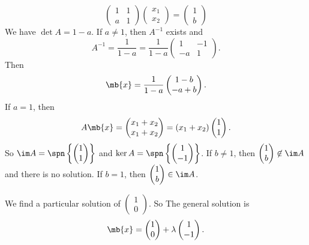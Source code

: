 \documentclass[a4paper]{article}
\begin{document}
\begin{eg}
  \[
  \begin{pmatrix}
    1 & 1\\
    a & 1
  \end{pmatrix}
  \begin{pmatrix}
    x_1\\
    x_2
  \end{pmatrix} =
  \begin{pmatrix}
    1\\
    b
  \end{pmatrix}
  \]
  We have $\det A = 1 - a$. If $a \not= 1$, then $A^{-1}$ exists and
  \[
  A^{-1} = \frac{1}{1 - a} = \frac{1}{1 - a}\begin{pmatrix}
    1 & -1\\
    -a & 1
  \end{pmatrix}.
  \]
  Then
  \[
  \mb{x} = \frac{1}{1- a}\begin{pmatrix}
    1 - b\\
    -a + b
  \end{pmatrix}.
  \]
  If $a = 1$, then
  \[
  A\mb{x} = \begin{pmatrix}
    x_1 + x_2\\
    x_1 + x_2
  \end{pmatrix} = (x_1 + x_2)\begin{pmatrix}
    1\\
    1
  \end{pmatrix}.
  \]
  So $\im A = \spn\left\{
  \begin{pmatrix}
    1\\1
  \end{pmatrix}
  \right\}$ and $\ker A = \spn\left\{
  \begin{pmatrix}
    1\\-1
  \end{pmatrix}
  \right\}$. If $b \not=1 $, then $\begin{pmatrix}
    1\\b
  \end{pmatrix}
  \not\in \im A$ and there is no solution. If $b = 1$, then $
  \begin{pmatrix}
    1\\b
  \end{pmatrix}
  \in \im A$.

  We find a particular solution of
  $\begin{pmatrix}
    1\\
    0
  \end{pmatrix}$. So The general solution is
  \[
  \mb{x} =
  \begin{pmatrix}
    1\\0
  \end{pmatrix}
  + \lambda
  \begin{pmatrix}
    1\\-1
  \end{pmatrix}.
  \]
\end{eg}
\end{document}
